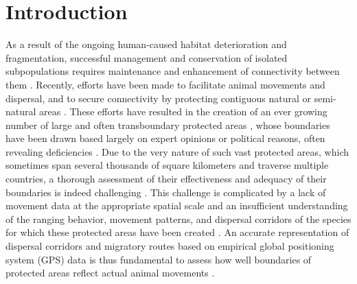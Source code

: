 \documentclass[abstract=on,10pt,a4paper,bibliography=totocnumbered]{article}
\begin{document}
\section{Introduction}
As a result of the ongoing human-caused habitat deterioration and fragmentation,
successful management and conservation of isolated subpopulations requires
maintenance and enhancement of connectivity between them \citep{Hanski.1998,
Fahrig.2003, Lindenmayer.2013}. Recently, efforts have been made to facilitate
animal movements and dispersal, and to secure connectivity by protecting
contiguous natural or semi-natural areas \citep{Heller.2009, Doerr.2011,
Rudnick.2012, Cozzi.2020}. These efforts have resulted in the creation of an
ever growing number of large and often transboundary protected areas
\citep{Wolmer.2003}, whose boundaries have been drawn based largely on expert
opinions or political reasons, often revealing deficiencies
\citep{Pullinger.2010}. Due to the very nature of such vast protected areas,
which sometimes span several thousands of square kilometers and traverse
multiple countries, a thorough assessment of their effectiveness and adequacy of
their boundaries is indeed challenging \citep{Rudnick.2012}. This challenge is
complicated by a lack of movement data at the appropriate spatial scale and an
insufficient understanding of the ranging behavior, movement patterns, and
dispersal corridors of the species for which these protected areas have been
created \citep{Vasudev.2015, Tshipa.2017, Cozzi.2020}. An accurate
representation of dispersal corridors and migratory routes based on empirical
global positioning system (GPS) data is thus fundamental to assess how well
boundaries of protected areas reflect actual animal movements \citep{Beier.2008,
Doerr.2011, Rudnick.2012}.
\end{document}
